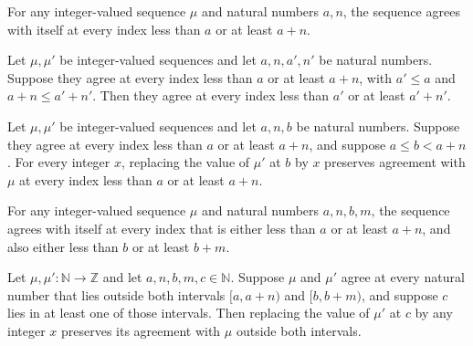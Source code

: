 \begin{theorem}
\label{Light.SameOutside.refl}
\leanok
{}
For any integer-valued sequence $\mu$ and natural numbers $a,n$, the sequence agrees
with itself at every index less than $a$ or at least $a+n$.
\end{theorem}

\begin{theorem}
\label{Light.SameOutside.mono}
\leanok
{}
Let $\mu,\mu'$ be integer-valued sequences and let $a,n,a',n'$ be natural numbers.
Suppose they agree at every index less than $a$ or at least $a+n$, with $a'\le a$ and
$a+n\le a'+n'$. Then they agree at every index less than $a'$ or at least $a'+n'$.
\end{theorem}

\begin{theorem}
\label{Light.SameOutside.update}
\leanok
{}
Let $\mu,\mu'$ be integer-valued sequences and let $a,n,b$ be natural numbers. Suppose
they agree at every index less than $a$ or at least $a+n$, and suppose $a\le b<a+n$. For
every integer $x$, replacing the value of $\mu'$ at $b$ by $x$ preserves agreement with
$\mu$ at every index less than $a$ or at least $a+n$.
\end{theorem}

\begin{theorem}
\label{Light.SameOutside2.refl}
\leanok
{}
For any integer-valued sequence $\mu$ and natural numbers $a,n,b,m$, the sequence agrees
with itself at every index that is either less than $a$ or at least $a+n$, and also
either less than $b$ or at least $b+m$.
\end{theorem}

\begin{theorem}
\label{Light.SameOutside2.update}
\leanok
{}
Let $\mu,\mu':\mathbb{N}\to\mathbb{Z}$ and let $a,n,b,m,c\in\mathbb{N}$. Suppose $\mu$
and $\mu'$ agree at every natural number that lies outside both intervals $[a,a+n)$ and
$[b,b+m)$, and suppose $c$ lies in at least one of those intervals. Then replacing the
value of $\mu'$ at $c$ by any integer $x$ preserves its agreement with $\mu$ outside
both intervals.
\end{theorem}

